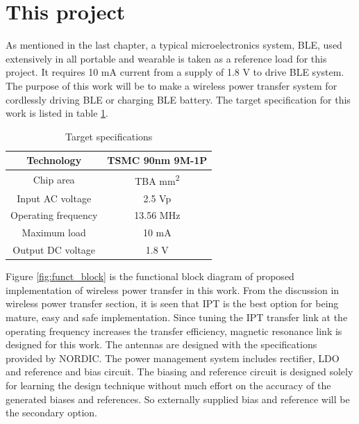 \documentclass[UKenglish]{ifimaster}  %
\begin{document}
\section{This project}
As mentioned in the last chapter, a typical microelectronics system, BLE, used extensively in all portable and 
wearable is taken as a reference load for this project. It requires 10 mA current from a supply of 1.8 V to drive 
BLE system. The purpose of this work will be to make a wireless power transfer system for cordlessly driving BLE 
or charging BLE battery. The target specification for this work is listed in table \ref{tab:proj_spec_tar}. \\

\begin{table}[!htbp]
\caption{Target specifications}
\begin{center}
\begin{tabular}{c|c}
\hline \hline
Technology 		& TSMC 90nm 9M-1P\\ \hline
Chip area 		& TBA mm\textsuperscript{2} \\ \hline
Input AC voltage	& 2.5 Vp \\ \hline
Operating frequency  	& 13.56 MHz \\ \hline
Maximum load 		& 10 mA \\ \hline
Output DC voltage 	& 1.8 V \\ 
\hline \hline
\end{tabular}
\end{center}
\label{tab:proj_spec_tar}
\end{table}

Figure \ref{fig:funct_block} is the functional block diagram of proposed implementation of wireless power transfer in 
this work. From the discussion in wireless power transfer section, it is seen that IPT is the best option for 
being mature, easy and safe implementation. Since tuning the IPT transfer link at the operating frequency 
increases the transfer efficiency, magnetic resonance link is designed for this work. The antennas are designed 
with the specifications provided by NORDIC. The power management system includes rectifier, LDO and reference and bias circuit. The biasing and reference circuit is designed solely for 
learning the design technique without much effort on the accuracy of the generated biases and references. So 
externally supplied bias and reference will be the secondary option. \\
\end{document}
